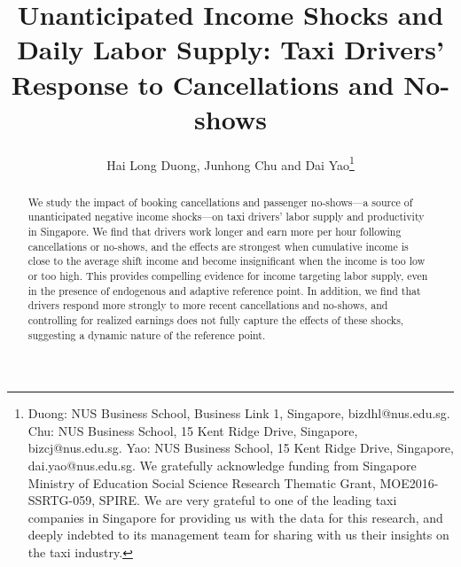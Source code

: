 \documentclass[reviewmode,AEJ]{AEA}
\begin{document}

\title{Unanticipated Income Shocks and Daily Labor Supply: Taxi Drivers' Response to Cancellations and No-shows}
\author{Hai Long Duong, Junhong Chu and Dai Yao\thanks{Duong: NUS Business School, Business Link 1, Singapore, bizdhl@nus.edu.sg. Chu: NUS Business School, 15 Kent Ridge Drive, Singapore, bizcj@nus.edu.sg. Yao: NUS Business School, 15 Kent Ridge Drive, Singapore, dai.yao@nus.edu.sg. We gratefully acknowledge funding from Singapore Ministry of Education Social Science Research Thematic Grant, MOE2016-SSRTG-059, SPIRE. We are very grateful to one of the leading taxi companies in Singapore for providing us with the data for this research, and deeply indebted to its management team for sharing with us their insights on the taxi industry.}}


\begin{abstract}
	We study the impact of booking cancellations and passenger no-shows---a source of unanticipated negative 
	income shocks---on taxi drivers' labor supply and productivity in Singapore. We find that 
	drivers work longer and earn more per hour following cancellations or no-shows, and the 
    effects are strongest when cumulative income is close to the average shift income and become 
    insignificant when the income is too low or too high. This provides 
	compelling evidence for income targeting labor supply, even in the presence of endogenous and adaptive 
	reference point. In addition, we find that drivers respond more strongly to more recent 
	cancellations and no-shows, and controlling for realized earnings does not fully capture the effects of these shocks,
	suggesting a dynamic nature of the reference point. 
\end{abstract}

\maketitle
\end{document}
